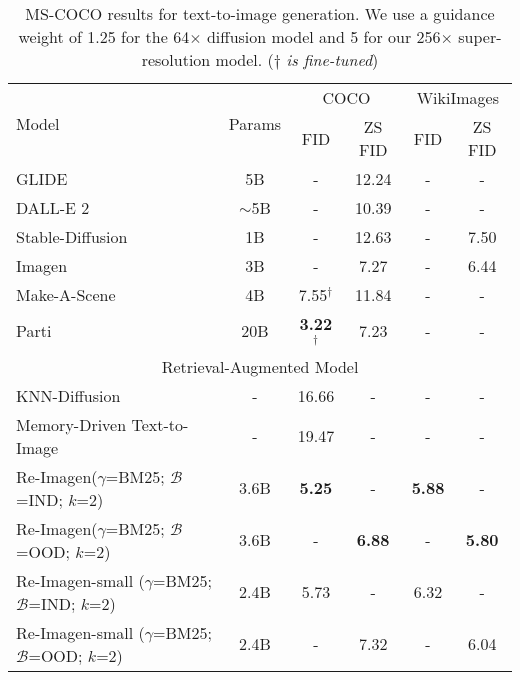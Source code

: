 \documentclass{article} \usepackage{iclr2023_conference,times}
\newcommand{\modelname}{{Re-Imagen}\xspace}
\newcommand{\pd}{\hphantom{.}}
\newcommand{\pz}{\hphantom{0}}
\begin{document}
\begin{table}[!t]
    \small
    \centering
    \begin{tabular}{lc|cc|cc}
        \toprule
        \multirow{2}{*}{Model}      & \multirow{2}{*}{Params} & \multicolumn{2}{c|}{COCO} & \multicolumn{2}{c}{WikiImages} \\
         &  & FID & ZS FID & FID & ZS FID \\
        \midrule
        GLIDE~\citep{nichol2021glide} & \pz\pd5B & - & 12.24 & - & -  \\
        DALL-E 2~\citep{ramesh2022hierarchical} & $\sim$5B & - & 10.39 & - & - \\
Stable-Diffusion~\citep{rombach2022high} & \pd\pz1B & - & 12.63 & - & 7.50  \\
        Imagen~\citep{saharia2022photorealistic} & \pd\pz3B  & - & \pz7.27 & - & 6.44  \\
        Make-A-Scene~\citep{gafni2022make} & \pd\pz4B  &  7.55$^\dagger$ & 11.84 & - & -  \\
        Parti~\citep{yu2022scaling} & \pd20B  & \textbf{3.22}$^\dagger$ & \pz7.23 & - & - \\
        \midrule
        \multicolumn{6}{c}{Retrieval-Augmented Model}  \\
        \midrule
        KNN-Diffusion~\citep{ashual2022knn} & - & 16.66 & - & - & -  \\
        Memory-Driven Text-to-Image~\citep{li2022memory} & - & 19.47 & - & - & - \\
        \midrule
        \modelname ($\gamma$=BM25; $\mathcal{B}$=IND; $k$=2) & 3.6B & \textbf{5.25} & -  & \textbf{5.88} & -\\
        \modelname ($\gamma$=BM25; $\mathcal{B}$=OOD; $k$=2) & 3.6B & - & \pz \textbf{6.88}  & -  &  \textbf{5.80} \\
        \modelname-small ($\gamma$=BM25; $\mathcal{B}$=IND; $k$=2) & 2.4B & 5.73 & - & 6.32 & - \\
        \modelname-small ($\gamma$=BM25; $\mathcal{B}$=OOD; $k$=2) & 2.4B & - & \pz 7.32 & - & 6.04 \\
\bottomrule
    \end{tabular}
    \caption{MS-COCO results for text-to-image generation. We use a guidance weight of 1.25 for the 64$\times$ diffusion model and 5 for our 256$\times$ super-resolution model. ($\dagger$ \textit{is fine-tuned})}
    \label{tab:coco}
    \vspace{-3ex}
\end{table}
\end{document}
